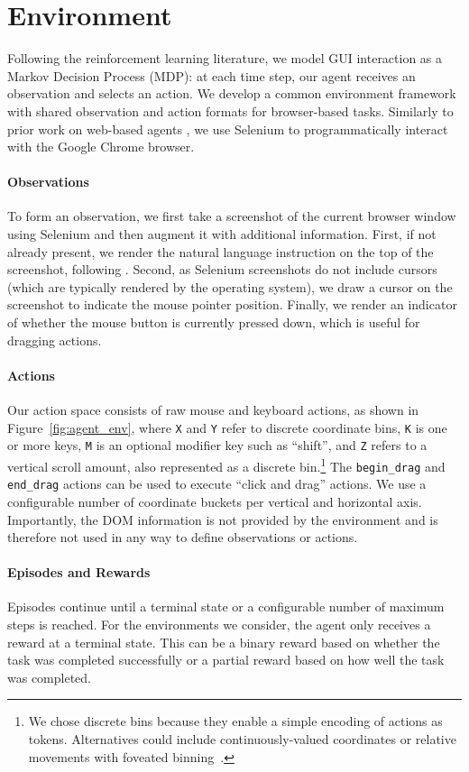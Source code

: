 \section{Environment}
\label{sec:environment}

Following the reinforcement learning literature, we model GUI interaction as a Markov Decision Process (MDP): at each time step, our agent receives an observation and selects an action.
We develop a common environment framework with shared observation and action formats for browser-based tasks.
Similarly to prior work on web-based agents \citep{liu2018reinforcement}, we use Selenium to programmatically interact with the Google Chrome browser.

\paragraph{Observations} To form an observation, we first take a screenshot of the current browser window using Selenium and then augment it with additional information. First, if not already present, we render the natural language instruction on the top of the screenshot, following \citet{lee2022pix2struct}.
Second, as Selenium screenshots do not include cursors (which are typically rendered by the operating system), we draw a cursor on the screenshot to indicate the mouse pointer position. Finally, we render an indicator of whether the mouse button is currently pressed down, which is useful for dragging actions.

\paragraph{Actions}  Our action space consists of raw mouse and keyboard actions, as shown in Figure~\ref{fig:agent_env}, where \texttt{X} and \texttt{Y} refer to discrete coordinate bins, \texttt{K} is one or more keys, \texttt{M} is an optional modifier key such as ``shift'', and \texttt{Z} refers to a vertical scroll amount, also represented as a discrete bin.\footnote{We chose discrete bins because they enable a simple encoding of actions as tokens. Alternatives could include continuously-valued coordinates or relative movements with foveated binning~\citep{baker2022video}.} The \texttt{begin\_drag} and \texttt{end\_drag} actions can be used to execute ``click and drag'' actions. We use a configurable number of coordinate buckets per vertical and horizontal axis. Importantly, the DOM information is not provided by the environment and is therefore not used in any way to define observations or actions.

\paragraph{Episodes and Rewards} Episodes continue until a terminal state or a configurable number of maximum steps is reached. For the environments we consider, the agent only receives a reward at a terminal state. This can be a binary reward based on whether the task was completed successfully or 
a partial reward based on how well the task was completed. 

